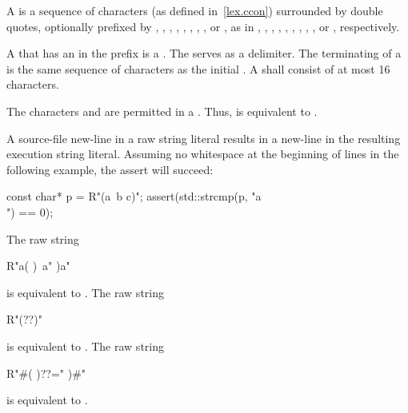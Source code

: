 \pnum
{}%
%
%
%
%
%
A  is a sequence of characters (as defined
in~\ref{lex.ccon}) surrounded by double quotes, optionally prefixed by
,
,
,
,
,
,
,
,
or ,
as in
,
,
,
,
,
,
,
,
,
or ,
respectively.

\pnum
A  that has an  in the prefix is a . The
 serves as a delimiter. The terminating
 of a  is the same sequence of
characters as the initial . A 
shall consist of at most 16 characters.

\pnum
\begin{note} The characters  and  are permitted in a
. Thus,  is equivalent to
. \end{note}

\pnum
\begin{note} A source-file new-line in a raw string literal results in a new-line in the
resulting execution string literal. Assuming no
whitespace at the beginning of lines in the following example, the assert will succeed:

\begin{codeblock}
const char* p = R"(a\
b
c)";
assert(std::strcmp(p, "a\\\nb\nc") == 0);
\end{codeblock}
\end{note}

\pnum
\begin{example} The raw string

\begin{codeblock}
R"a(
)\
a"
)a"
\end{codeblock}

is equivalent to . The raw string

\begin{codeblock}
R"(??)"
\end{codeblock}

is equivalent to . The raw string

\begin{codeblock}
R"#(
)??="
)#"
\end{codeblock}

is equivalent to . \end{example}

